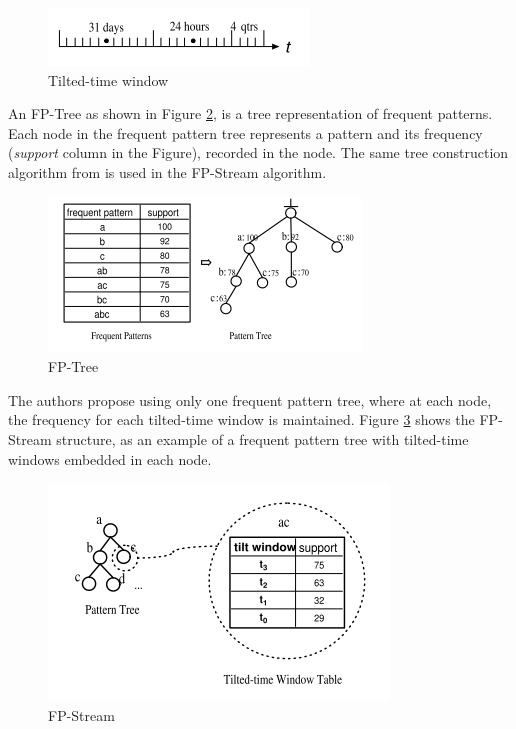 \begin{figure}[!htb]
    \begin{center}
      \includegraphics[scale=1]{figures/tilted-time-window.png}
      \caption{Tilted-time window}
      \label{fig:tilted-time-window}
    \end{center}
\end{figure}

An FP-Tree \cite{Han-FP-tree} as shown in Figure \ref{fig:fptree}, is a tree representation of frequent patterns. Each node in the frequent pattern tree represents a pattern and its frequency (\textit{support} column in the Figure), recorded in the node. The same tree construction algorithm from \cite{Han-FP-tree} is used in the FP-Stream algorithm. 

\begin{figure}[!htb]
    \begin{center}
      \includegraphics[scale=1]{figures/fptree.png}
      \caption{FP-Tree}
      \label{fig:fptree}
    \end{center}
\end{figure}

The authors propose using only one frequent pattern tree, where at each node, the frequency for each tilted-time window is maintained. Figure \ref{fig:fpstream} shows the FP-Stream structure, as an example of a frequent pattern tree with tilted-time windows embedded in each node.

\begin{figure}[!htb]
    \begin{center}
      \includegraphics[scale=0.8]{figures/fp-stream.png}
      \caption{FP-Stream}
      \label{fig:fpstream}
    \end{center}
\end{figure}

